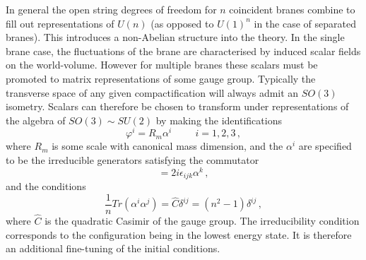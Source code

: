 In general the open string degrees of freedom for $n$ coincident branes 
combine to fill out representations of $U(n)$ (as opposed to $U(1)^n$ 
in the case of separated branes). This introduces a non-Abelian 
structure into the theory. In the single brane case, the fluctuations of the 
brane are characterised by induced scalar fields on the world-volume. 
However for multiple branes
these scalars must be promoted to matrix representations of some gauge group. 
% 
Typically the transverse space of any given compactification will always admit
an $SO(3)$ isometry. Scalars can therefore be chosen to 
transform under representations of the algebra of $SO(3) \sim SU(2)$ by making 
the identifications
% 
\begin{equation}
\varphi^i = R_m \alpha^i \hspace{1cm} i =1, 2, 3 \,,
\end{equation}
% 
where $R_m$ is some scale with canonical mass dimension, and the $\alpha^i$ are
specified to be the irreducible generators satisfying the commutator
% 
\begin{equation}
[\alpha^i, \alpha^j] = 2i \epsilon_{ijk} \alpha^k \,,
\end{equation}
% 
and the conditions
% 
\begin{equation}
\frac{1}{n} Tr(\alpha^i \alpha^j) = \hat{C} \delta^{ij} = (n^2-1) \delta^{ij}
\,,
\end{equation}
% 
where $\hat{C}$ is the quadratic Casimir of the gauge group.
The irreducibility condition corresponds to the configuration being in the
lowest energy state. It is therefore an additional fine-tuning
of the initial conditions. 


